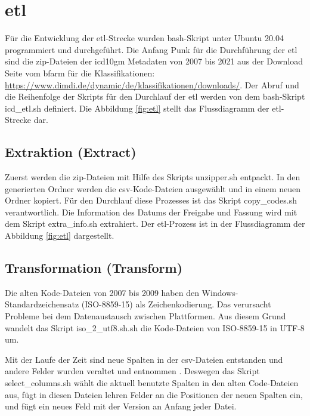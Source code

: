 \section{\acs{etl}} \label{etlpipeline}
Für die Entwicklung der \ac{etl}-Strecke wurden \ac{bash}-Skript unter Ubuntu 20.04 programmiert und durchgeführt. Die Anfang Punk für die Durchführung der \ac{etl} sind die \ac{zip}-Dateien der \ac{icd10gm} Metadaten von 2007 bis 2021 aus der Download Seite vom \ac{bfarm} für die Klassifikationen: \url{https://www.dimdi.de/dynamic/de/klassifikationen/downloads/}. Der Abruf und die Reihenfolge der Skripts für den Durchlauf der \ac{etl} werden von dem \ac{bash}-Skript {\ttfamily icd\_etl.sh} definiert. Die Abbildung \ref{fig:etl} stellt das Flussdiagramm der \ac{etl}-Strecke dar.

\subsection{Extraktion (Extract)}

Zuerst werden die \ac{zip}-Dateien mit Hilfe des Skripts {\ttfamily unzipper.sh} entpackt. In den generierten Ordner werden die \ac{csv}-Kode-Dateien ausgewählt und in einem neuen Ordner kopiert. Für den Durchlauf diese Prozesses ist das Skript {\ttfamily copy\_codes.sh} verantwortlich. Die Information des Datums der Freigabe und Fassung wird mit dem Skript {\ttfamily extra\_info.sh} extrahiert. Der \ac{etl}-Prozess ist in der Flussdiagramm der Abbildung \ref{fig:etl} dargestellt.

\subsection{Transformation (Transform)}

Die alten Kode-Dateien von 2007 bis 2009 haben den Windows-Standardzeichensatz (ISO-8859-15) als Zeichenkodierung. Das verursacht Probleme bei dem Datenaustausch zwischen Plattformen. Aus diesem Grund wandelt das Skript {\ttfamily iso\_2\_utf8.sh.sh} die Kode-Dateien von ISO-8859-15 in UTF-8 um.

Mit der Laufe der Zeit sind neue Spalten in der \ac{csv}-Dateien entstanden und andere Felder wurden veraltet und entnommen \cite{readme13, readme17}. Deswegen das Skript {\ttfamily select\_columns.sh} wählt die aktuell benutzte Spalten in den alten Code-Dateien aus, fügt in diesen Dateien lehren Felder an die Positionen der neuen Spalten ein, und fügt ein neues Feld mit der Version an Anfang jeder Datei.

